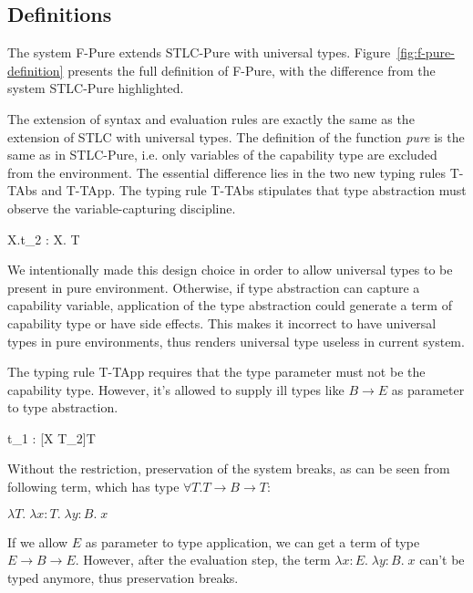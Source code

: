 \subsection{Definitions}

The system F-Pure extends STLC-Pure with universal
types. Figure~\ref{fig:f-pure-definition} presents the full definition
of F-Pure, with the difference from the system STLC-Pure highlighted.

The extension of syntax and evaluation rules are exactly the same as
the extension of STLC with universal types. The definition of the
function \emph{pure} is the same as in STLC-Pure, i.e. only variables
of the capability type are excluded from the environment. The essential
difference lies in the two new typing rules T-TAbs and T-TApp. The
typing rule T-TAbs stipulates that type abstraction must observe the
variable-capturing discipline.

{ \Gamma \vdash \lambda X.t_2 : \forall X. T }

We intentionally made this design choice in order to allow universal
types to be present in pure environment. Otherwise, if type
abstraction can capture a capability variable, application of the type
abstraction could generate a term of capability type or have side
effects. This makes it incorrect to have universal types in pure
environments, thus renders universal type useless in current system.

The typing rule T-TApp requires that the type parameter must not be
the capability type. However, it's allowed to supply ill types like
$B \to E$ as parameter to type abstraction.


{ \Gamma \vdash t_1 \; [T_2] : [X \mapsto T_2]T }

Without the restriction, preservation of the system breaks, as can be
seen from following term, which has type $\forall T. T \to B \to T$:

\begin{center}
  $\lambda T. \; \lambda x:T. \; \lambda y:B. \; x$
\end{center}

If we allow $E$ as parameter to type application, we can get a term of
type $E \to B \to E$. However, after the evaluation step, the term
$\lambda x:E. \; \lambda y:B. \; x$ can't be typed anymore, thus
preservation breaks.

